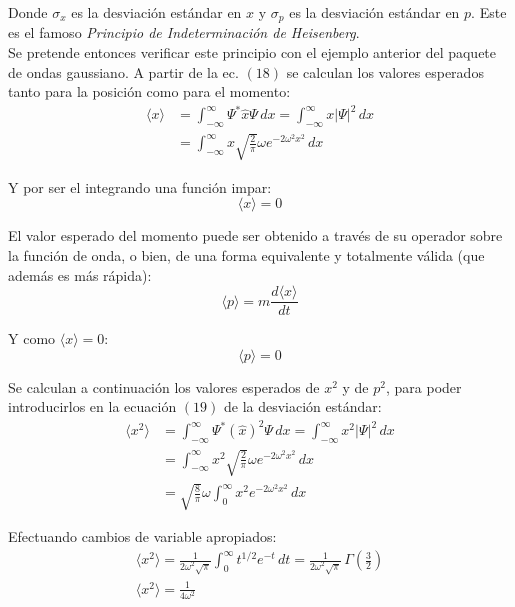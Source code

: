Donde $\sigma_{x}$ es la desviación estándar en $x$ y $\sigma_{p}$ es la desviación estándar en $p$. Este es el famoso 
\emph{Principio de Indeterminación de Heisenberg}.\\

Se pretende entonces verificar este principio con el ejemplo anterior del paquete de ondas gaussiano. A partir de la ec. 
$(18)$ se calculan los valores esperados tanto para la posición como para el momento:
\begin{align*}
    \langle x \rangle &= \int_{-\infty}^{\infty} \Psi^* \hat{x} \Psi \, dx = \int_{-\infty}^{\infty} x \lvert\Psi\rvert^2\,dx \\
    &= \int_{-\infty}^{\infty} x \sqrt{\frac{2}{\pi}} \omega e^{-2\omega^2x^2} \,dx
\end{align*}

Y por ser el integrando una función impar:
\begin{equation*}
    \langle x \rangle = 0
\end{equation*}

El valor esperado del momento puede ser obtenido a través de su operador sobre la función de onda, o bien, de una forma 
equivalente y totalmente válida (que además es más rápida):
\begin{equation}
    \langle p \rangle = m \frac{d\langle x \rangle}{dt}
\end{equation}

Y como $\langle x \rangle=0$:
\begin{equation*}
    \langle p \rangle = 0
\end{equation*}

Se calculan a continuación los valores esperados de $x^2$ y de $p^2$, para poder introducirlos en la ecuación $(19)$ de la 
desviación estándar:
\begin{align*}
    \langle x^2 \rangle &= \int_{-\infty}^{\infty} \Psi^* (\hat{x})^2 \Psi \, dx = \int_{-\infty}^{\infty} x^2 \lvert\Psi\rvert^2\,dx \\
    &= \int_{-\infty}^{\infty} x^2 \sqrt{\frac{2}{\pi}} \omega e^{-2\omega^2x^2} \,dx \\
    &= \sqrt{\frac{8}{\pi}} \omega \int_{0}^{\infty} x^2 e^{-2\omega^2x^2} \,dx
\end{align*}

Efectuando cambios de variable apropiados:
\begin{gather*}
    \langle x^2 \rangle = \frac{1}{2\omega^2\sqrt{\pi}} \int_{0}^{\infty} t^{1/2} e^{-t}\,dt 
    = \frac{1}{2\omega^2\sqrt{\pi}} \,\Gamma(\frac{3}{2}) \\
    \langle x^2 \rangle = \frac{1}{4\omega^2}
\end{gather*}

